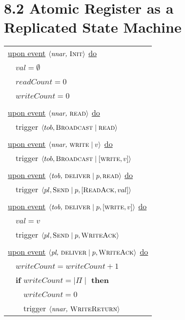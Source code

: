 \documentclass{article}
\begin{document}
	\section*{8.2 Atomic Register as a Replicated State Machine}
	\begin{center}
		\begin{tabular}{l}
			\underline{upon event} $\langle \textit{nnar, } \textsc{Init} \rangle$ \underline{do} \\
			\ \ $\textit{val} = \emptyset$ \\
			\ \ $\textit{readCount} = 0$ \\
			\ \ $\textit{writeCount} = 0$ \\
			\\
			\underline{upon event} $\langle \textit{nnar, } \textsc{read} \rangle$ \underline{do} \\
			\ \ trigger $\langle tob, \textsc{Broadcast} \mid \textsc{read} \rangle$ \\
			\\
			\underline{upon event} $\langle \textit{nnar, } \textsc{write} \mid v \rangle$ \underline{do} \\
			\ \ trigger $\langle tob, \textsc{Broadcast} \mid [\textsc{write},v] \rangle$ \\
			\\
			\underline{upon event} $\langle \textit{tob, } \textsc{deliver} \mid p, \textsc{read} \rangle$ \underline{do} \\
			\ \ trigger $\langle pl, \textsc{Send} \mid p, [\textsc{ReadAck},val] \rangle$ \\
			\\
			\underline{upon event} $\langle \textit{tob, } \textsc{deliver} \mid p, [\textsc{write},v] \rangle$ \underline{do} \\
			\ \ $\textit{val} = v$ \\
			\ \ trigger $\langle pl, \textsc{Send} \mid p, \textsc{WriteAck} \rangle$ \\
			\\
			\underline{upon event} $\langle \textit{pl, } \textsc{deliver} \mid p, \textsc{WriteAck} \rangle$ \underline{do} \\
			\ \ $\textit{writeCount} = \textit{writeCount} + 1$ \\
			\ \ \textbf{if} $\textit{writeCount} = \mid \Pi \mid$ \textbf{then} \\
			\ \ \ \ $\textit{writeCount} = 0$ \\
			\ \ \ \ trigger $\langle \textit{nnar, } \textsc{WriteReturn} \rangle$ \\

\end{tabular}
\end{center}
\end{document}
